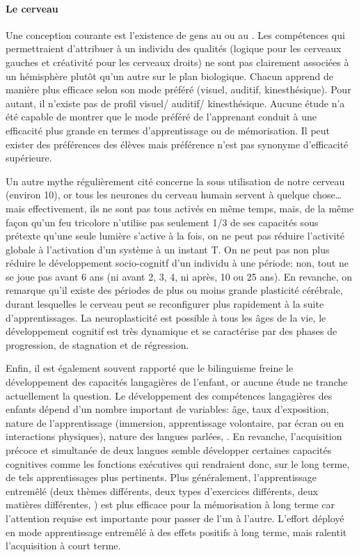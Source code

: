             \paragraph{Le cerveau}
                Une conception courante est l'existence de gens au  ou au .
                Les compétences qui permettraient d’attribuer à un individu des qualités (logique pour les cerveaux gauches et créativité pour les cerveaux droits) ne sont pas clairement associées à un hémisphère plutôt qu’un autre sur le plan biologique.
                Chacun apprend de manière plus efficace selon son mode préféré (visuel, auditif, kinesthésique). Pour autant, il n'existe pas de profil visuel/ auditif/ kinesthésique.
                Aucune étude n’a été capable de montrer que le mode préféré de l’apprenant conduit à une efficacité plus grande en termes d’apprentissage ou de mémorisation. Il peut exister des préférences des élèves mais préférence n’est pas synonyme d’efficacité supérieure.\par%
                Un autre mythe régulièrement cité concerne la sous utilisation de notre cerveau (environ 10\prc), or tous les neurones du cerveau humain servent à quelque chose\dots mais effectivement, ils ne sont pas tous activés en même temps, mais, de la même façon qu'un feu tricolore n'utilise pas seulement 1/3 de ses capacités sous prétexte qu'une seule lumière s'active à la fois, on ne peut pas réduire l'activité globale à l'activation d'un système à un instant T.
                On ne peut pas non plus réduire le développement socio-cognitf d'un individu à une période: non, tout ne se joue pas avant 6 ans (ni avant 2, 3, 4, ni après, 10 ou 25 ans). En revanche, on remarque qu’il existe des périodes de plus ou moins grande plasticité cérébrale, durant lesquelles le cerveau peut se reconfigurer plus rapidement à la suite d’apprentissages. La neuroplasticité est possible à tous les âges de la vie, le développement cognitif est très dynamique et se caractérise par des phases de progression, de stagnation et de régression.\par%
                Enfin, il est également souvent rapporté que le bilinguisme freine le développement des capacités langagières de l’enfant, or aucune étude ne tranche actuellement la question. Le développement des compétences langagières des enfants dépend d’un nombre important de variables: âge, taux d’exposition, nature de l’apprentissage (immersion, apprentissage volontaire, par écran ou en interactions physiques), nature des langues parlées, \etc. En revanche, l’acquisition précoce et simultanée de deux langues semble développer certaines capacités cognitives comme les fonctions exécutives qui rendraient donc, sur le long terme, de tels apprentissages plus pertinents. Plus généralement, l’apprentissage entremêlé (deux thèmes différents, deux types d’exercices différents, deux matières différentes, \etc) est plus efficace pour la mémorisation à long terme car l’attention requise est importante pour passer de l’un à l’autre. L’effort déployé en mode apprentissage entremêlé à des effets positifs à long terme, mais ralentit l'acquisition à court terme.
